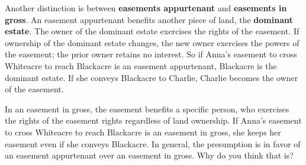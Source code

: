 Another distinction is between \textbf{easements appurtenant} and
\textbf{easements in gross}. An easement appurtenant benefits another piece of
land, the \textbf{dominant estate}. The owner of the dominant estate exercises
the rights of the easement. If ownership of the dominant estate changes, the new
owner exercises the powers of the easement; the prior owner retains no interest.
So if Anna's easement to cross Whiteacre to reach Blackacre is an easement
appurtenant, Blackacre is the dominant estate. If she conveys Blackacre to
Charlie, Charlie becomes the owner of the easement. 

In an easement in gross, the easement benefits a specific person, who exercises
the rights of the easement rights regardless of land ownership. If Anna's
easement to cross Whiteacre to reach Blackacre is an easement in gross, she
keeps her easement even if she conveys Blackacre. In general, the presumption is
in favor of an easement appurtenant over an easement in gross. Why do you think
that is?

